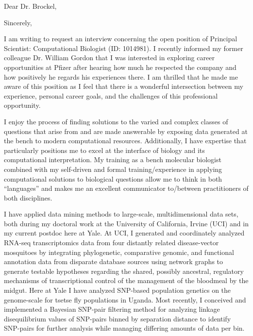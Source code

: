 \documentclass[11pt,letterpaper,sans,draft]{moderncv}
\begin{document}
\date{\today}
\opening{Dear Dr. Brockel,}
\closing{Sincerely,}
\makelettertitle

\vspace{-1\baselineskip}
I am writing to request an interview concerning the open position of Principal Scientist: Computational Biologist (ID: 1014981).
I recently informed my former colleague Dr. William Gordon that I was interested in exploring career opportunities at Pfizer after hearing how much he respected the company and how positively he regards his experiences there.
I am thrilled that he made me aware of this position as I feel that there is a wonderful intersection between my experience, personal career goals, and the challenges of this professional opportunity.



I enjoy the process of finding solutions to the varied and complex classes of questions that arise from and are made answerable by exposing data generated at the bench to modern computational resources.
Additionally, I have expertise that particularly positions me to excel at the interface of biology and its computational interpretation.
My training as a bench molecular biologist combined with my self-driven and formal training/experience in applying computational solutions to biological questions allow me to think in both ``languages'' and makes me an excellent communicator to/between practitioners of both disciplines.

I have applied data mining methods to large-scale, multidimensional data sets, both during my doctoral work at the University of California, Irvine (UCI) and in my current postdoc here at Yale. 
At UCI, I generated and coordinately analyzed RNA-seq transcriptomics data from four distantly related disease-vector mosquitoes by integrating phylogenetic, comparative genomic, and functional annotation data from disparate database sources using network graphs to generate testable hypotheses regarding the shared, possibly ancestral, regulatory mechanisms of transcriptional control of the management of the bloodmeal by the midgut. 
Here at Yale I have analyzed SNP-based population genetics on the genome-scale for tsetse fly populations in Uganda.
Most recently, I conceived and implemented a Bayesian SNP-pair filtering method for analyzing linkage disequilibrium values of SNP-pairs binned by separation distance to identify SNP-pairs for further analysis while managing differing amounts of data per bin.
\end{document}
